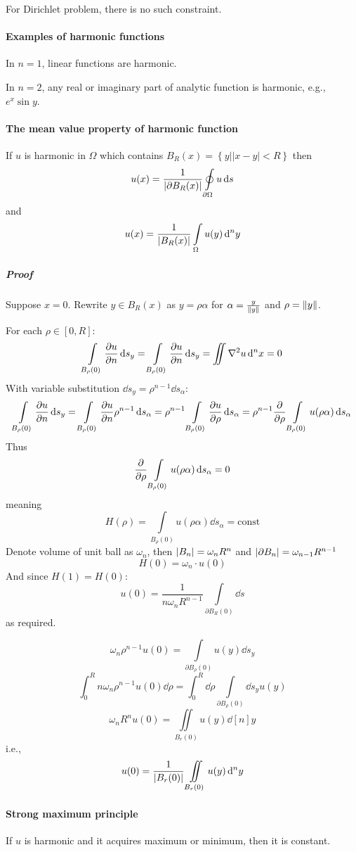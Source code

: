 For Dirichlet problem, there is no such constraint.

\paragraph{Examples of harmonic functions}
In $n=1$, linear functions are harmonic.

In $n=2$, any real or imaginary part of analytic function is harmonic, e.g., $e^x \sin y$.
\paragraph{The mean value property of harmonic function}
If $u$ is harmonic in $\Omega$ which contains $B_R(x) = \left\{ y| |x-y|<R \right\}$
then
$$u(x) = \frac{1}{\abs{\partial B_R(x)}} \oint\limits_{\partial \Omega} u \dd{s} $$
and
$$u(x) = \frac{1}{\abs{ B_R(x)}} \int\limits_{\Omega} u(y) \dd[n]{y} $$
\subparagraph{Proof}
Suppose $x=0$.
Rewrite $y\in B_R(x) $ as $y=\rho\alpha$ for $\alpha= \frac{y}{\norm{y}}$ and $\rho = \norm{y}$.

For each $\rho\in [0,R]$:
$$\int\limits_{B_\rho(0)} \pdv{u}{n} (\rho\alpha) \dd{s_y}=\int\limits_{B_\rho(0)} \pdv{u}{n} (y) \dd{s_y} = \iint \laplacian{u} \dd[n]{x} = 0$$
With variable substitution $\dd{s_y} = \rho^{n-1}\dd{s_\alpha}$:
$$\int\limits_{B_\rho(0)} \pdv{u}{n} (\rho\alpha) \dd{s_y}=\int\limits_{B_\rho(0)} \pdv{u}{n} (\rho\alpha) \rho^{n-1} \dd{s_\alpha}=\rho^{n-1} \int\limits_{B_\rho(0)} \pdv{u}{\rho} (\rho\alpha)  \dd{s_\alpha} = \rho^{n-1}  \pdv{\rho} \int\limits_{B_\rho(0)}  u(\rho\alpha)  \dd{s_\alpha}$$
Thus
$$\pdv{\rho} \int\limits_{B_\rho(0)}  u(\rho\alpha)  \dd{s_\alpha} = 0$$
meaning
$$H(\rho) = \int\limits_{B_\rho(0)}  u(\rho\alpha)  \dd{s_\alpha} = \text{const}$$
Denote volume of unit ball as $\omega_n$, then $\abs{B_n} = \omega_n R^n$ and $\abs{\partial B_n} = \omega_{n-1}R^{n-1}$ 
$$H(0) = \omega_n \cdot u(0)$$
And since $H(1) = H(0)$:
$$u(0) = \frac{1}{n\omega_n R^{n-1}} \int\limits_{\partial B_R(0)} \dd{s}$$
as required.

$$\omega_n \rho^{n-1} u(0) = \int\limits_{\partial B_\rho(0)} u(y) \dd{s_y}$$
$$\int_0^R n \omega_n \rho^{n-1} u(0) \dd{\rho} = \int_0^R \dd{\rho} \int\limits_{\partial B_\rho(0)}  \dd{s_y} u(y)$$
$$\omega_n R^n u(0) = \iint\limits_{B_r(0)} u(y) \dd[n]{y}$$
i.e.,
$$u(0) = \frac{1}{\abs{B_r(0)}} \iint\limits_{B_r(0)} u(y) \dd[n]{y}$$
	\paragraph{Strong maximum principle }
	If $u$ is harmonic and it acquires maximum or minimum, then it is constant.
